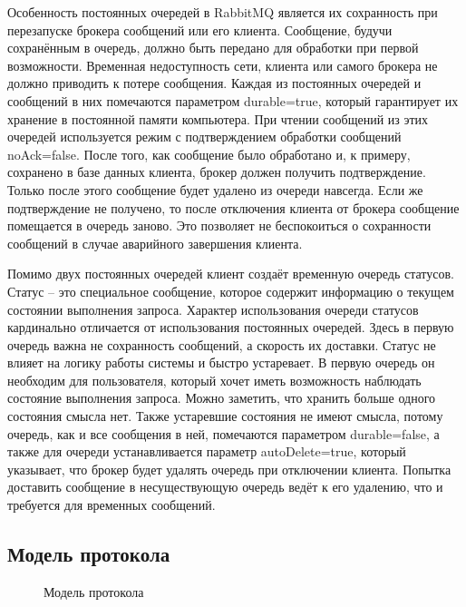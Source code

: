 Особенность постоянных очередей в RabbitMQ является их сохранность при
перезапуске брокера сообщений или его клиента. Сообщение, будучи сохранённым
в очередь, должно быть передано для обработки при первой возможности.
Временная недоступность сети, клиента или самого брокера не должно приводить
к потере сообщения. Каждая из постоянных очередей и сообщений в них
помечаются параметром durable=true, который гарантирует их хранение в постоянной
памяти компьютера. При чтении сообщений из этих очередей используется режим
с подтверждением обработки сообщений noAck=false. После того, как сообщение
было обработано и, к примеру, сохранено в базе данных клиента, брокер
должен получить подтверждение. Только после этого сообщение будет удалено
из очереди навсегда. Если же подтверждение не получено, то после отключения
клиента от брокера сообщение помещается в очередь заново. Это позволяет
не беспокоиться о сохранности сообщений в случае аварийного завершения клиента.

Помимо двух постоянных очередей клиент создаёт временную очередь статусов.
Статус -- это специальное сообщение, которое содержит информацию о текущем
состоянии выполнения запроса.
Характер использования очереди статусов кардинально отличается от использования
постоянных очередей. Здесь в первую очередь важна не сохранность сообщений,
а скорость их доставки. Статус не влияет на логику работы системы и быстро
устаревает. В первую очередь он необходим для пользователя, который хочет
иметь возможность наблюдать состояние выполнения запроса. Можно заметить,
что хранить больше одного состояния смысла нет. Также устаревшие состояния
не имеют смысла, потому очередь, как и все сообщения в ней, помечаются
параметром durable=false, а также для очереди устанавливается параметр
autoDelete=true, который указывает, что брокер будет удалять очередь
при отключении клиента. Попытка доставить сообщение в несуществующую очередь
ведёт к его удалению, что и требуется для временных сообщений.

\subsection{Модель протокола}
\begin{figure}[H]
    \centering
    
    \caption{Модель протокола}
    \label{fig:brokerproto}
\end{figure}

